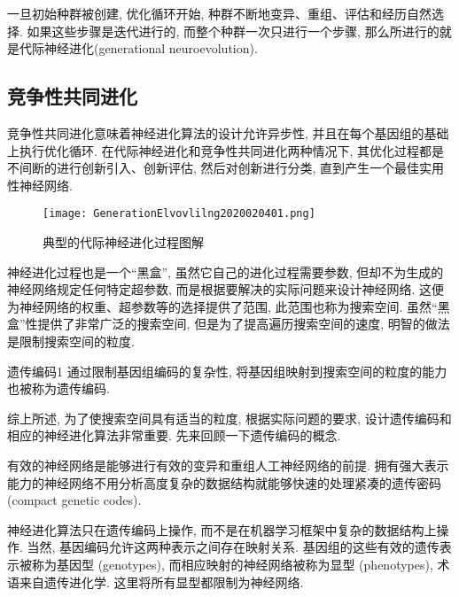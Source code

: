 \begin{remark}
    一旦初始种群被创建, 优化循环开始, 种群不断地变异、重组、评估和经历自然选择.
如果这些步骤是迭代进行的, 而整个种群一次只进行一个步骤, 那么所进行的就是代际神经进化(generational neuroevolution).
\end{remark}
\subsection{竞争性共同进化}
竞争性共同进化意味着神经进化算法的设计允许异步性, 并且在每个基因组的基础上执行优化循环.
在代际神经进化和竞争性共同进化两种情况下, 其优化过程都是不间断的进行创新引入、创新评估, 然后对创新进行分类, 直到产生一个最佳实用性神经网络.
\begin{figure}[H]
    \centering
    \texttt{[image: GenerationElvovlilng2020020401.png]}
    \caption{典型的代际神经进化过程图解}
    \label{GenerationElvovlilng2020020401}
    \vspace{-0.4cm}
\end{figure}

\begin{remark}
神经进化过程也是一个“黑盒”, 虽然它自己的进化过程需要参数, 但却不为生成的神经网络规定任何特定超参数, 而是根据要解决的实际问题来设计神经网络.
这便为神经网络的权重、超参数等的选择提供了范围, 此范围也称为搜索空间.
虽然“黑盒”性提供了非常广泛的搜索空间, 但是为了提高遍历搜索空间的速度, 明智的做法是限制搜索空间的粒度.
\end{remark}

\begin{mydef}{遗传编码}{1}
    通过限制基因组编码的复杂性, 将基因组映射到搜索空间的粒度的能力也被称为遗传编码.
\end{mydef}

\begin{remark}
    综上所述, 为了使搜索空间具有适当的粒度, 根据实际问题的要求, 设计遗传编码和相应的神经进化算法非常重要. 先来回顾一下遗传编码的概念.
\end{remark}

有效的神经网络是能够进行有效的变异和重组人工神经网络的前提.
拥有强大表示能力的神经网络不用分析高度复杂的数据结构就能够快速的处理紧凑的遗传密码 (compact genetic codes).
\begin{remark}
神经进化算法只在遗传编码上操作, 而不是在机器学习框架中复杂的数据结构上操作.
当然, 基因编码允许这两种表示之间存在映射关系.
基因组的这些有效的遗传表示被称为基因型 (genotypes), 而相应映射的神经网络被称为显型 (phenotypes), 术语来自遗传进化学. 这里将所有显型都限制为神经网络.
\end{remark}

